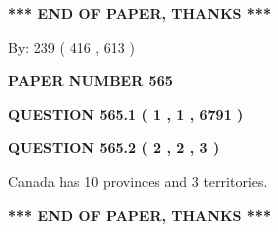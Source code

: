\documentclass[12pt]{article}
\begin{document}
 
 
 
   
   
 \vspace{0.2in}
 
   
   
   
   
\vspace{1.0in} 
{\textbf{\large{ *** END OF PAPER, THANKS *** }}} 
   
   
\hspace{1.0in} By: 
 239 ( 416 ,  613 )
   
   
   
   
\newpage 
\setcounter{page}{ 
   565001 } 
   
   
   
   
 {\textbf{ \Large{ PAPER NUMBER  565  }}}
   
   
\vspace{0.2in}
   
   
   
   
   
   
 \vspace{0.2in}
 
 
 
 
   
   
  
\vspace{0.2in}
  
{\textbf{\Large{QUESTION
565.1 
 ( 1 , 1 , 6791 )
}}}
  
  
  
\vspace{0.2in}
  
{\textbf{\Large{QUESTION
565.2 
 ( 2 , 2 , 3 )
}}}
  
  
 
 
\noindent{}
 
 
Canada has 10  provinces and 3 territories.
 
 
 
 
   
   
 \vspace{0.2in}
 
   
   
   
   
\vspace{1.0in} 
{\textbf{\large{ *** END OF PAPER, THANKS *** }}} 
   
\end{document}
